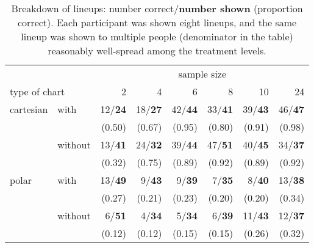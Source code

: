 \begin{table}[hbtp]
\centering
	\begin{tabular}{ll@{   }r@{   }r@{   }r@{   }r@{   }r@{   }r}
	& & \multicolumn{6}{c}{sample size}  \\
        \multicolumn{2}{l}{type of chart} & 2 & 4 & 6 & 8 & 10 & 24 \\ [1pt] \hline 
	cartesian & with & 12/{\bf 24}& 18/{\bf 27} & 42/{\bf 44} & 33/{\bf 41} & 39/{\bf 43} & 46/{\bf 47}\\
	       &      &(0.50)& (0.67) & (0.95) & (0.80) & (0.91) & (0.98)\\[1pt]
	& without & 13/{\bf 41} &24/{\bf 32}& 39/{\bf 44} & 47/{\bf 51} & 40/{\bf 45} & 34/{\bf 37}\\
	&         & (0.32) &(0.75)& (0.89) & (0.92) & (0.89) & (0.92)\\[3pt] %
	polar & with & 13/{\bf 49}& 9/{\bf 43} & 9/{\bf 39} & 7/{\bf 35} & 8/{\bf 40} & 13/{\bf 38} \\
	      &      & (0.27)& (0.21) & (0.23) & (0.20) & (0.20) & (0.34) \\[1pt]
	& without & 6/{\bf 51}&   4/{\bf 34} &  5/{\bf 34} &  6/{\bf 39} & 11/{\bf 43} &  12/{\bf 37} \\
        &         & (0.12) & (0.12) &  (0.15) &  (0.15) & (0.26) &  (0.32)\\ 
	\end{tabular}
\caption{\label{tbl:treatment} Breakdown of lineups: number correct/\textbf{number shown} (proportion correct). Each participant was shown eight lineups, and the same lineup was shown to multiple people (denominator in the table) reasonably well-spread among the treatment levels. }
\end{table}


